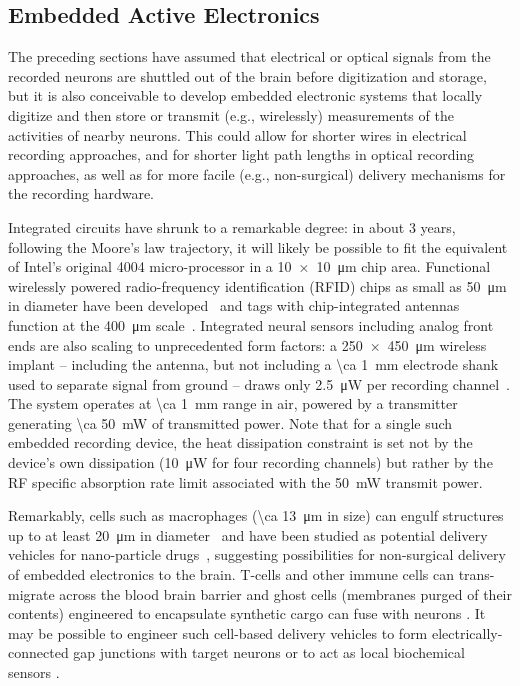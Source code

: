 \subsection{Embedded Active Electronics}

The preceding sections have assumed that electrical or optical signals from the recorded neurons are shuttled out of the brain before digitization and storage, but it is also conceivable to develop embedded electronic systems that locally digitize and then store or transmit (e.g., wirelessly) measurements of the activities of nearby neurons.
This could allow for shorter wires in electrical recording approaches, and for shorter light path lengths in optical recording approaches, as well as for more facile (e.g., non-surgical) delivery mechanisms for the recording hardware.

Integrated circuits have shrunk to a remarkable degree: in about 3 years, following the Moore's law trajectory, it will likely be possible to fit the equivalent of Intel's original 4004 micro-processor in a \SI{10 x 10}{\micro\meter} chip area.
Functional wirelessly powered radio-frequency identification (RFID) chips as small as \SI{50}{\micro\meter} in diameter have been developed~\cite{Usami2007} and tags with chip-integrated antennas function at the \SI{400}{\micro\meter} scale~\cite{ImpinjMonzaFive}.
Integrated neural sensors including analog front ends are also scaling to unprecedented form factors: a \SI{250 x 450}{\micro\meter} wireless implant -- including the antenna, but not including a \SI{\ca 1}{\milli\meter} electrode shank used to separate signal from ground -- draws only \SI{2.5}{\micro\watt} per recording channel~\cite{biederman13}. The system operates at \SI{\ca 1}{\milli\meter} range in air, powered by a transmitter generating \SI{\ca 50}{\milli\watt} of transmitted power.
Note that for a single such embedded recording device, the heat dissipation constraint is set not by the device's own dissipation (\SI{10}{\micro\watt} for four recording channels) but rather by the RF specific absorption rate limit associated with the \SI{50}{\milli\watt} transmit power.

Remarkably, cells such as macrophages (\SI{\ca 13}{\micro\meter} in size) can engulf structures up to at least \SI{20}{\micro\meter} in diameter~\cite{cannon92} and have been studied as potential delivery vehicles for nano-particle drugs~\cite{Kadiu11}, suggesting possibilities for non-surgical delivery of embedded electronics to the brain. T-cells and other immune cells can trans-migrate across the blood brain barrier \cite{Engelhardt2006} and ghost cells (membranes purged of their contents) engineered to encapsulate synthetic cargo \cite{Cinti2011} can fuse with neurons \cite{Hikawa1989162}. It may be possible to engineer such cell-based delivery vehicles to form electrically-connected gap junctions \cite{Spruston2001669} with target neurons or to act as local biochemical sensors \cite{nguyen2009vivo}.

